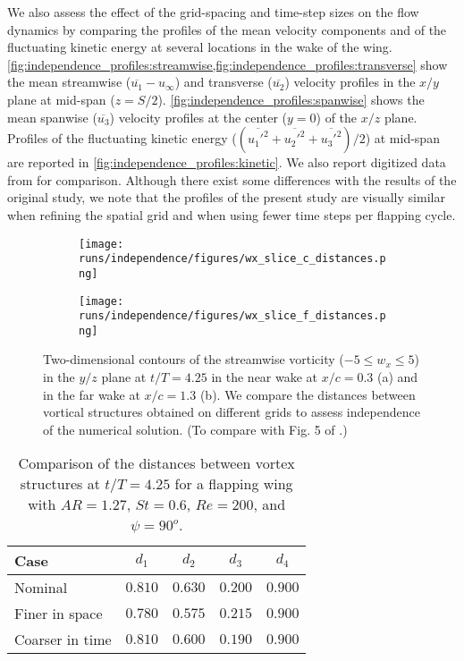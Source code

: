 We also assess the effect of the grid-spacing and time-step sizes on the flow dynamics by comparing the profiles of the mean velocity components and of the fluctuating kinetic energy at several locations in the wake of the wing.
\cref{fig:independence_profiles:streamwise,fig:independence_profiles:transverse} show the mean streamwise ($\overline{u_1} - u_\infty$) and transverse ($\overline{u_2}$) velocity profiles in the $x/y$ plane at mid-span ($z = S / 2$).
\cref{fig:independence_profiles:spanwise} shows the mean spanwise ($\overline{u_3}$) velocity profiles at the center ($y = 0$) of the $x/z$ plane.
Profiles of the fluctuating kinetic energy ($( \overline{{u_1'}^2} + \overline{{u_2'}^2} + \overline{{u_3'}^2} ) / 2$) at mid-span are reported in \cref{fig:independence_profiles:kinetic}.
We also report digitized data from \citet{li_dong_2016} for comparison.
Although there exist some differences with the results of the original study, we note that the profiles of the present study are visually similar when refining the spatial grid and when using fewer time steps per flapping cycle.

\begin{figure}
  \centering
  \begin{subfigure}[c]{0.35\textwidth}
    \centering
    \texttt{[image: runs/independence/figures/wx\_slice\_c\_distances.png]}
    \caption{}
  \end{subfigure}
  \hspace{1em}
  \begin{subfigure}[c]{0.35\textwidth}
    \centering
    \texttt{[image: runs/independence/figures/wx\_slice\_f\_distances.png]}
    \caption{}
  \end{subfigure}
  \caption{Two-dimensional contours of the streamwise vorticity ($-5 \leq w_x \leq 5$) in the $y/z$ plane at $t/T = 4.25$ in the near wake at $x / c = 0.3$ (a) and in the far wake at $x / c = 1.3$ (b). We compare the distances between vortical structures obtained on different grids to assess independence of the numerical solution. (To compare with Fig. 5 of \citet{li_dong_2016}.)}
  \label{fig:independence_wx_distances}
\end{figure}

\begin{table}
  \centering
  \begin{tabular}{lcccc}
    \hline\hline
    Case & $d_1$ & $d_2$ & $d_3$ & $d_4$ \\
    \hline
    Nominal & $0.810$ & $0.630$ & $0.200$ & $0.900$ \\
    Finer in space & $0.780$ & $0.575$ & $0.215$ & $0.900$ \\
    Coarser in time & $0.810$ & $0.600$ & $0.190$ & $0.900$ \\
    \hline\hline
  \end{tabular}
  \caption{Comparison of the distances between vortex structures at $t / T = 4.25$ for a flapping wing with $AR = 1.27$, $St = 0.6$, $Re = 200$, and $\psi = 90^o$.}
  \label{tab:independence_wx_distances}
\end{table}

